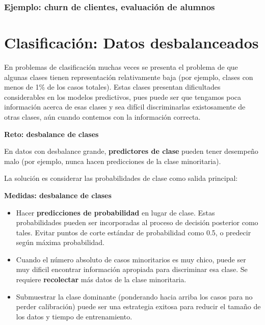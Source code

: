 \documentclass[
]{book}
\providecommand{\tightlist}{%
  \setlength{\itemsep}{0pt}\setlength{\parskip}{0pt}}
\let\BeginKnitrBlock\begin \let\EndKnitrBlock\end
\begin{document}
\hypertarget{ejemplo-churn-de-clientes-evaluaciuxf3n-de-alumnos}{%
\subsubsection*{Ejemplo: churn de clientes, evaluación de alumnos}\label{ejemplo-churn-de-clientes-evaluaciuxf3n-de-alumnos}}


\hypertarget{clasificaciuxf3n-datos-desbalanceados}{%
\section{Clasificación: Datos desbalanceados}\label{clasificaciuxf3n-datos-desbalanceados}}

En problemas de clasificación muchas veces se presenta el problema de que algunas
clases tienen representación relativamente baja (por ejemplo, clases con menos de 1\% de los
casos totales). Estas clases presentan dificultades considerables en los modelos predictivos, pues puede ser que tengamos poca información acerca de esas clases y sea difícil discriminarlas existosamente de otras clases, aún cuando contemos con la información correcta.

\BeginKnitrBlock{rmdnote}
\textbf{Reto: desbalance de clases}

En datos con desbalance grande, \textbf{predictores de clase} pueden tener desempeño malo
(por ejemplo, nunca hacen predicciones de la clase minoritaria).
\EndKnitrBlock{rmdnote}

La solución es considerar las probabilidades de clase como salida principal:

\BeginKnitrBlock{rmdtip}
\textbf{Medidas: desbalance de clases}

\begin{itemize}
\tightlist
\item
  Hacer \textbf{predicciones de probabilidad} en lugar de clase. Estas probabilidades pueden ser incorporadas al proceso de decisión posterior como tales. Evitar puntos de corte estándar de probabilidad como 0.5, o predecir según máxima probabilidad.
\item
  Cuando el número absoluto de casos minoritarios es muy chico, puede ser muy dificil encontrar información apropiada para discriminar esa clase. Se requiere \textbf{recolectar} más datos de la clase minoritaria.
\item
  Submuestrar la clase dominante (ponderando hacia arriba los casos para no perder calibración) puede ser una estrategia exitosa para reducir el tamaño de los datos y tiempo de entrenamiento.
\end{itemize}
\EndKnitrBlock{rmdtip}
\end{document}
